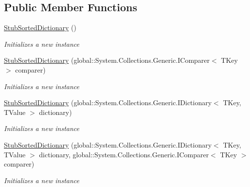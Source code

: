 \subsection*{Public Member Functions}
\begin{DoxyCompactItemize}
\item 
\hyperlink{class_system_1_1_collections_1_1_generic_1_1_fakes_1_1_stub_sorted_dictionary_3_01_t_key_00_01_t_value_01_4_a1186668f5ddbc603514d5ae8a1dcc328}{Stub\-Sorted\-Dictionary} ()
\begin{DoxyCompactList}\small\item\em Initializes a new instance\end{DoxyCompactList}\item 
\hyperlink{class_system_1_1_collections_1_1_generic_1_1_fakes_1_1_stub_sorted_dictionary_3_01_t_key_00_01_t_value_01_4_a44767c685cc548338e1f9f16f31ed2df}{Stub\-Sorted\-Dictionary} (global\-::\-System.\-Collections.\-Generic.\-I\-Comparer$<$ T\-Key $>$ comparer)
\begin{DoxyCompactList}\small\item\em Initializes a new instance\end{DoxyCompactList}\item 
\hyperlink{class_system_1_1_collections_1_1_generic_1_1_fakes_1_1_stub_sorted_dictionary_3_01_t_key_00_01_t_value_01_4_a4d76f66a892683e4be270e2c18330948}{Stub\-Sorted\-Dictionary} (global\-::\-System.\-Collections.\-Generic.\-I\-Dictionary$<$ T\-Key, T\-Value $>$ dictionary)
\begin{DoxyCompactList}\small\item\em Initializes a new instance\end{DoxyCompactList}\item 
\hyperlink{class_system_1_1_collections_1_1_generic_1_1_fakes_1_1_stub_sorted_dictionary_3_01_t_key_00_01_t_value_01_4_aaf6db387d5e0f8c25f8a194baf92bc15}{Stub\-Sorted\-Dictionary} (global\-::\-System.\-Collections.\-Generic.\-I\-Dictionary$<$ T\-Key, T\-Value $>$ dictionary, global\-::\-System.\-Collections.\-Generic.\-I\-Comparer$<$ T\-Key $>$ comparer)
\begin{DoxyCompactList}\small\item\em Initializes a new instance\end{DoxyCompactList}\end{DoxyCompactItemize}
